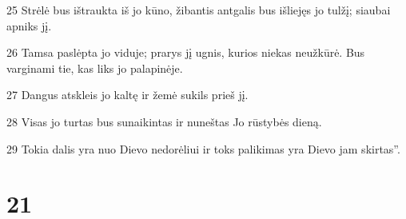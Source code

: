 \par 25 Strėlė bus ištraukta iš jo kūno, žibantis antgalis bus išliejęs jo tulžį; siaubai apniks jį. 
\par 26 Tamsa paslėpta jo viduje; prarys jį ugnis, kurios niekas neužkūrė. Bus varginami tie, kas liks jo palapinėje. 
\par 27 Dangus atskleis jo kaltę ir žemė sukils prieš jį. 
\par 28 Visas jo turtas bus sunaikintas ir nuneštas Jo rūstybės dieną. 
\par 29 Tokia dalis yra nuo Dievo nedorėliui ir toks palikimas yra Dievo jam skirtas”.



\chapter{21}


